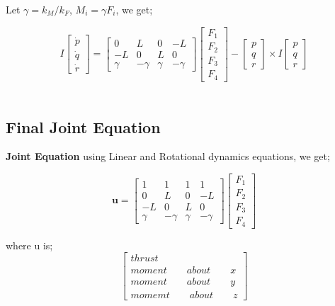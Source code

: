 Let $\gamma = k_M/k_F$, $M_i = \gamma F_i$, we get;
\vspace{10pt}

\[
I\begin{bmatrix}
    \dot{p} \\
    \dot{q} \\
    \dot{r}
\end{bmatrix} = 
\begin{bmatrix}
    0 & L & 0 & -L \\
    -L & 0 & L & 0 \\
    \gamma & -\gamma & \gamma & -\gamma
\end{bmatrix}
\begin{bmatrix}
    F_1 \\
    F_2 \\
    F_3 \\
    F_4
\end{bmatrix}- 
\begin{bmatrix}
    p \\
    q \\
    r
\end{bmatrix}
\times I\begin{bmatrix}
    p \\
    q \\
    r
\end{bmatrix}
\]
\\

\subsection{Final Joint Equation}

\textbf{Joint Equation} using Linear and Rotational dynamics equations, we get;

\[
\textbf{u} = \begin{bmatrix}
    1 & 1 & 1 & 1 \\
    0 & L & 0 & -L \\
    -L & 0 & L & 0 \\
    \gamma & -\gamma & \gamma & -\gamma
\end{bmatrix}
\begin{bmatrix}
    F_1 \\
    F_2 \\
    F_3 \\
    F_4 
\end{bmatrix}
\]

where u is;
\[
\begin{bmatrix}
    thrust \\
    moment\qquad about\qquad x \\
    moment\qquad about\qquad y \\
    momemt\qquad about\qquad z 
\end{bmatrix}
\]
\\

